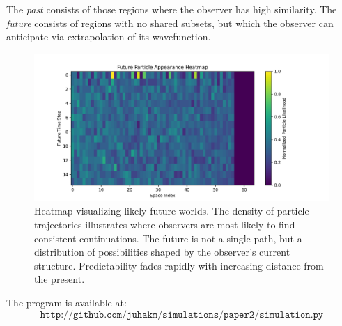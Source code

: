 \documentclass[11pt]{article}
\begin{document}
The \textit{past} consists of those regions where the observer has high similarity. The \textit{future} consists of regions with no shared subsets, but which the observer can anticipate via extrapolation of its wavefunction.

\begin{figure}[h!]
    \centering
    \includegraphics[width=1.0\textwidth]{figures/future_particle_heatmap.png}
    \caption{Heatmap visualizing likely future worlds. The density of particle trajectories illustrates where observers are most likely to find consistent continuations. The future is not a single path, but a distribution of possibilities shaped by the observer's current structure. Predictability fades rapidly with increasing distance from the present.}
    \label{fig:future_particle_heatmap}
\end{figure}

The program is available at:
\[
    \texttt{http://github.com/juhakm/simulations/paper2/simulation.py}
\]
\end{document}
